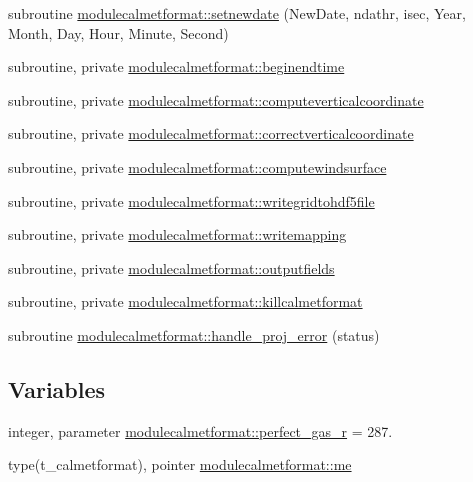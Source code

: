 \begin{DoxyCompactItemize}
\item 
subroutine \mbox{\hyperlink{namespacemodulecalmetformat_a3defaeb10661bad427bb6a70e331c077}{modulecalmetformat\+::setnewdate}} (New\+Date, ndathr, isec, Year, Month, Day, Hour, Minute, Second)
\item 
subroutine, private \mbox{\hyperlink{namespacemodulecalmetformat_a62bd4a5f15fb34c0505c736e02ac62ca}{modulecalmetformat\+::beginendtime}}
\item 
subroutine, private \mbox{\hyperlink{namespacemodulecalmetformat_abd990931d70766e3d45c4c5e94a1924f}{modulecalmetformat\+::computeverticalcoordinate}}
\item 
subroutine, private \mbox{\hyperlink{namespacemodulecalmetformat_aebd4c52189e33c42d4eddb372d91a66d}{modulecalmetformat\+::correctverticalcoordinate}}
\item 
subroutine, private \mbox{\hyperlink{namespacemodulecalmetformat_ac65fd3f15792bec4c3a1f8809e7d201a}{modulecalmetformat\+::computewindsurface}}
\item 
subroutine, private \mbox{\hyperlink{namespacemodulecalmetformat_a49e8d2600dc3c064290f04ab142db105}{modulecalmetformat\+::writegridtohdf5file}}
\item 
subroutine, private \mbox{\hyperlink{namespacemodulecalmetformat_ab777b0fc84a3a4b2505fadc6db40580f}{modulecalmetformat\+::writemapping}}
\item 
subroutine, private \mbox{\hyperlink{namespacemodulecalmetformat_a77546a7a587e6ab71724b1a5ebb7e709}{modulecalmetformat\+::outputfields}}
\item 
subroutine, private \mbox{\hyperlink{namespacemodulecalmetformat_a7703da81b5a94320621a668c0326f881}{modulecalmetformat\+::killcalmetformat}}
\item 
subroutine \mbox{\hyperlink{namespacemodulecalmetformat_a2e6285b2b96d5b3545d7755b77b65502}{modulecalmetformat\+::handle\+\_\+proj\+\_\+error}} (status)
\end{DoxyCompactItemize}
\subsection*{Variables}
\begin{DoxyCompactItemize}
\item 
integer, parameter \mbox{\hyperlink{namespacemodulecalmetformat_a21173190f31cd07dd3e9d96b03a51822}{modulecalmetformat\+::perfect\+\_\+gas\+\_\+r}} = 287.
\item 
type(t\+\_\+calmetformat), pointer \mbox{\hyperlink{namespacemodulecalmetformat_a30d8b055512bccb5b1dd9cd00e4c790b}{modulecalmetformat\+::me}}
\end{DoxyCompactItemize}
